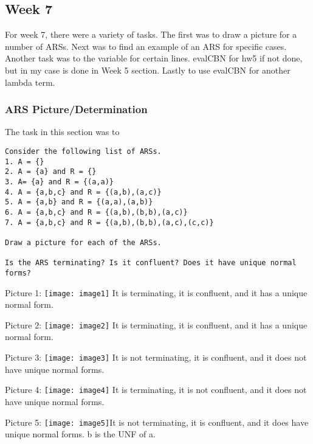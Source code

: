 \documentclass{article}
\theoremstyle{theorem}
\theoremstyle{definition}
\theoremstyle{remark}
\begin{document}
\subsection{Week 7}
For week 7, there were a variety of tasks. The first was to draw a picture for a number of ARSs. Next was to find an example of an ARS for specific cases. Another task was to the variable for certain lines. evalCBN for hw5 if not done, but in my case is done in Week 5 section. Lastly to use evalCBN for another lambda term.

\subsubsection{ARS Picture/Determination}

The task in this section was to \begin{verbatim}
Consider the following list of ARSs.
1. A = {}
2. A = {a} and R = {}
3. A= {a} and R = {(a,a)}
4. A = {a,b,c} and R = {(a,b),(a,c)}
5. A = {a,b} and R = {(a,a),(a,b)}
6. A = {a,b,c} and R = {(a,b),(b,b),(a,c)}
7. A = {a,b,c} and R = {(a,b),(b,b),(a,c),(c,c)}

Draw a picture for each of the ARSs.

Is the ARS terminating? Is it confluent? Does it have unique normal forms?
\end{verbatim}

\noindent Picture 1:
\texttt{[image: image1]}
\noindent\newline It is terminating, it is confluent, and it has a unique normal form.

\noindent\newline\newline Picture 2:
\texttt{[image: image2]}
\noindent\newline It is terminating, it is confluent, and it has a unique normal form.

\noindent\newline\newline Picture 3:
\texttt{[image: image3]}
\noindent\newline It is not terminating, it is confluent, and it does not have unique normal forms.

\noindent\newline\newline Picture 4:
\texttt{[image: image4]}
\noindent\newline It is terminating, it is not confluent, and it does not have unique normal forms.

\noindent\newline\newline Picture 5:
\texttt{[image: image5]}\noindent\newline It is not terminating, it is confluent, and it does have unique normal forms. b is the UNF of a.
\end{document}
